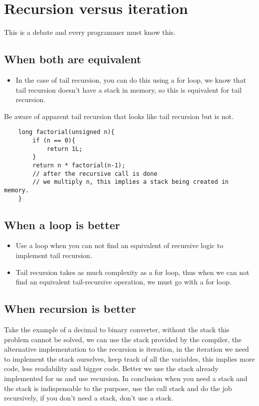 \section{Recursion versus iteration}
This is a debate and every programmer must know this. 
\subsection{When both are equivalent}
\begin{itemize}
    \item In the case of tail recursion, you can do this using a for loop, we know that tail recursion doesn't have a stack in memory, so this is equivalent for tail recursion. 
\end{itemize}

Be aware of apparent tail recursion that looks like tail recursion but is not. 

\begin{verbatim}
    long factorial(unsigned n){
        if (n == 0){
            return 1L;
        } 
        return n * factorial(n-1);
        // after the recursive call is done
        // we multiply n, this implies a stack being created in memory. 
    }
\end{verbatim}

\subsection{When a loop is better}
\begin{itemize}
    \item Use a loop when you can not find an equivalent of recursive logic to implement tail recursion. 
    \item Tail recursion takes as much complexity as a for loop, thus when we can not find an equivalent tail-recursive operation, we must go with a for loop. 
\end{itemize}

\subsection{When recursion is better}
Take the example of a decimal to binary converter, without the stack this problem cannot be solved, we can use the stack provided by the compiler, the alternative implementation to the recursion is iteration, in the iteration we need to implement the stack ourselves, keep track of all the variables, this implies more code, less readability and bigger code. Better we use the stack already implemented for us and use recursion. In conclusion when you need a stack and the stack is indispensable to the purpose, use the call stack and do the job recursively, if you don't need a stack, don't use a stack.

